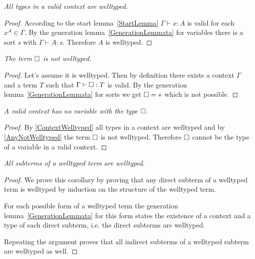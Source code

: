 \begin{corollary}
    \label{ContextWelltyped}
    \emph{All types in a valid context are welltyped}.

    \begin{proof}
        According to the start lemma~\ref{StartLemma} $\Gamma \vdash x : A$ is
        valid for each $x^A \in \Gamma$. By the generation
        lemma~\ref{GenerationLemmata} for variables there is a sort $s$ with
        $\Gamma \vdash A : s$. Therefore $A$ is welltyped.
    \end{proof}
\end{corollary}



\begin{corollary}
    \label{AnyNotWelltyped}
    \emph{The term $\Box$ is not welltyped}.

    \begin{proof}
        Let's assume it is welltyped. Then by definition there exists a context
        $\Gamma$ and a term $T$ such that $\Gamma \vdash \Box : T$ is valid. By
        the generation lemma~\ref{GenerationLemmata} for sorts we get $\Box =
        *$ which is not possible.
    \end{proof}
\end{corollary}




\begin{corollary}
    \label{ContextHasNoAny}
    \emph{A valid context has no variable with the type $\Box$}.

    \begin{proof}
        By \ref{ContextWelltyped} all types in a context are welltyped and by
        \ref{AnyNotWelltyped} the term $\Box$ is not welltyped. Therefore $\Box$
        cannot be the type of a variable in a valid context.
    \end{proof}
\end{corollary}




\begin{corollary}
    \label{SubtermWelltyped}
    \emph{All subterms of a welltyped term are welltyped}.

    \begin{proof}
        We prove this corollary by proving that any direct subterm of a
        welltyped term is welltyped by induction on the structure of the
        welltyped term.

        For each possible form of a welltyped term the generation
        lemma~\ref{GenerationLemmata} for this form states the existence
        of a context and a type of each direct subterm, i.e. the direct subterms
        are welltyped.

        Repeating the argument proves that all indirect subterms of a welltyped
        subterm are welltyped as well.
    \end{proof}
\end{corollary}





